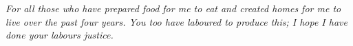 \textit{For all those who have prepared food for me to eat and created homes for
  me to live over the past four years. You too have laboured to produce this; I
hope I have done your labours justice.}

